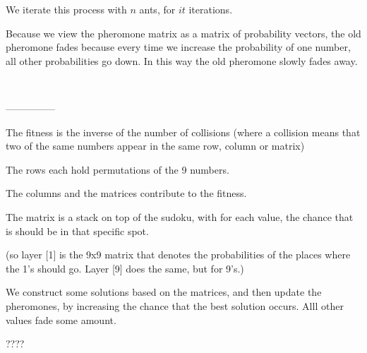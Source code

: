 \documentclass[11pt]{article}
\begin{document}
We iterate this process with $n$ ants, for $it$ iterations.

Because we view the pheromone matrix as a matrix of probability vectors, the old pheromone fades because every time we increase the probability of one number, all other probabilities go down. In this way the old pheromone slowly fades away.
 
\ \ \  \ \ \ 






---------------

The fitness is the inverse of the number of collisions (where a collision means that two of the same numbers appear in the same row, column or matrix)

The rows each hold permutations of the 9 numbers. 

The columns and the matrices contribute to the fitness.

The matrix is a stack on top of the sudoku, with for each value, the chance that is should be in that specific spot.

(so layer [1] is the 9x9 matrix that denotes the probabilities of the places where the 1's should go. Layer [9] does the same, but for 9's.)

We construct some solutions based on the matrices, and then update the pheromones, by increasing the chance that the best solution occurs. Alll other values fade some amount.

????
\end{document}
